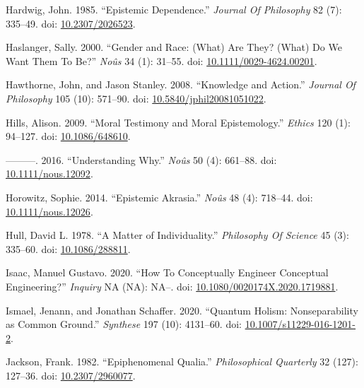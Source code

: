 \documentclass[
  10pt,
  letterpaper,
  DIV=11,
  numbers=noendperiod,
  twoside]{scrartcl}
\newlength{\cslhangindent}
\newenvironment{CSLReferences}[2] %
 {\begin{list}{}{%
  \setlength{\itemindent}{0pt}
  \setlength{\leftmargin}{0pt}
  \setlength{\parsep}{0pt}
  \ifodd #1
   \setlength{\leftmargin}{\cslhangindent}
   \setlength{\itemindent}{-1\cslhangindent}
  \fi
  \setlength{\itemsep}{#2\baselineskip}}}
 {\end{list}}
\begin{document}
\begin{CSLReferences}{1}{0}
Hardwig, John. 1985. {``Epistemic Dependence.''} \emph{Journal Of
Philosophy} 82 (7): 335--49. doi:
\href{https://doi.org/10.2307/2026523}{10.2307/2026523}.

Haslanger, Sally. 2000. {``Gender and Race: (What) Are They? (What) Do
We Want Them To Be?''} \emph{Noûs} 34 (1): 31--55. doi:
\href{https://doi.org/10.1111/0029-4624.00201}{10.1111/0029-4624.00201}.

Hawthorne, John, and Jason Stanley. 2008. {``Knowledge and Action.''}
\emph{Journal Of Philosophy} 105 (10): 571--90. doi:
\href{https://doi.org/10.5840/jphil20081051022}{10.5840/jphil20081051022}.

Hills, Alison. 2009. {``Moral Testimony and Moral Epistemology.''}
\emph{Ethics} 120 (1): 94--127. doi:
\href{https://doi.org/10.1086/648610}{10.1086/648610}.

---------. 2016. {``Understanding Why.''} \emph{Noûs} 50 (4): 661--88.
doi: \href{https://doi.org/10.1111/nous.12092}{10.1111/nous.12092}.

Horowitz, Sophie. 2014. {``Epistemic Akrasia.''} \emph{Noûs} 48 (4):
718--44. doi:
\href{https://doi.org/10.1111/nous.12026}{10.1111/nous.12026}.

Hull, David L. 1978. {``A Matter of Individuality.''} \emph{Philosophy
Of Science} 45 (3): 335--60. doi:
\href{https://doi.org/10.1086/288811}{10.1086/288811}.

Isaac, Manuel Gustavo. 2020. {``How To Conceptually Engineer Conceptual
Engineering?''} \emph{Inquiry} NA (NA): NA--. doi:
\href{https://doi.org/10.1080/0020174X.2020.1719881}{10.1080/0020174X.2020.1719881}.

Ismael, Jenann, and Jonathan Schaffer. 2020. {``Quantum Holism:
Nonseparability as Common Ground.''} \emph{Synthese} 197 (10): 4131--60.
doi:
\href{https://doi.org/10.1007/s11229-016-1201-2}{10.1007/s11229-016-1201-2}.

Jackson, Frank. 1982. {``Epiphenomenal Qualia.''} \emph{Philosophical
Quarterly} 32 (127): 127--36. doi:
\href{https://doi.org/10.2307/2960077}{10.2307/2960077}.


\end{CSLReferences}
\end{document}

